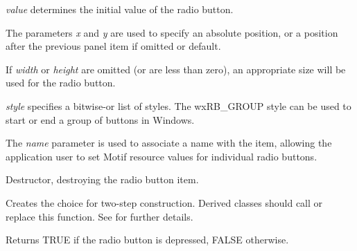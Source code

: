 {\it value} determines the initial value of the radio button.

The parameters {\it x} and {\it y} are used to specify an absolute
position, or a position after the previous panel item if omitted or
default.

If {\it width} or {\it height} are omitted (or are less than zero), an
appropriate size will be used for the radio button.

{\it style} specifies a bitwise-or list of styles. The wxRB\_GROUP style
can be used to start or end a group of buttons in Windows.

The {\it name} parameter is used to associate a name with the item,
allowing the application user to set Motif resource values for
individual radio buttons.



Destructor, destroying the radio button item.




Creates the choice for two-step construction. Derived classes
should call or replace this function. See 
for further details.



Returns TRUE if the radio button is depressed, FALSE otherwise.



